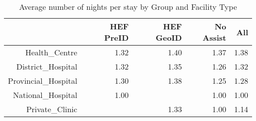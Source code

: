 \begin{table}[ht]
\centering
\begin{tabular}{rrrrr}
  \hline
 & HEF PreID & HEF GeoID & No Assist & All \\ 
  \hline
Health\_Centre & 1.32 & 1.40 & 1.37 & 1.38 \\ 
  District\_Hospital & 1.32 & 1.35 & 1.26 & 1.32 \\ 
  Provincial\_Hospital & 1.30 & 1.38 & 1.25 & 1.28 \\ 
  National\_Hospital & 1.00 &  & 1.00 & 1.00 \\ 
  Private\_Clinic &  & 1.33 & 1.00 & 1.14 \\ 
   \hline
\end{tabular}
\caption{Average number of nights per stay by Group and Facility Type} 
\end{table}
